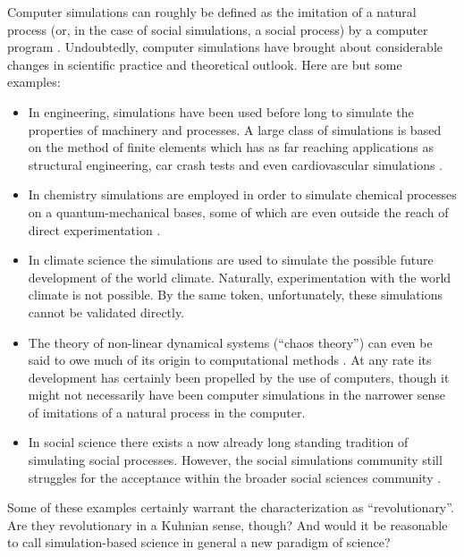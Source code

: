 \documentclass[12pt, a4paper]{article}
\begin{document}
Computer simulations can roughly be defined as the imitation of a
natural process (or, in the case of social simulations, a social
process) by a computer program \citep{hartmann:1996}. Undoubtedly,
computer simulations have brought about considerable changes in
scientific practice and theoretical outlook. Here are but some
examples:

\begin{itemize}
  \item In engineering, simulations have been used before long to
    simulate the properties of machinery and processes. A large class
    of simulations is based on the method of finite elements which has
    as far reaching applications as structural engineering, car crash
    tests and even cardiovascular simulations
    \citep{carusi-et-al:2013}.

  \item In chemistry simulations are employed in order to simulate
    chemical processes on a quantum-mechanical bases, some of which
    are even outside the reach of direct experimentation
    \citep{arnold-kaestner:2013}.

  \item In climate science the simulations are used to simulate the
    possible future development of the world climate. Naturally,
    experimentation with the world climate is not possible. By the
    same token, unfortunately, these simulations cannot be validated
    directly.

  \item The theory of non-linear dynamical systems (``chaos theory'')
    can even be said to owe much of its origin to computational
    methods \citep{gleick:2011}. At any rate its development has
    certainly been propelled by the use of computers, though it might
    not necessarily have been computer simulations in the narrower
    sense of imitations of a natural process in the computer.

  \item In social science there exists a now already long standing
    tradition of simulating social processes. However, the social
    simulations community still struggles for the acceptance within
    the broader social sciences community
    \citep{squazzoni-casnici:2013}.
\end{itemize}

Some of these examples certainly warrant the characterization as
``revolutionary''. Are they revolutionary in a Kuhnian sense, though?
And would it be reasonable to call simulation-based science in general
a new paradigm of science?
\end{document}
